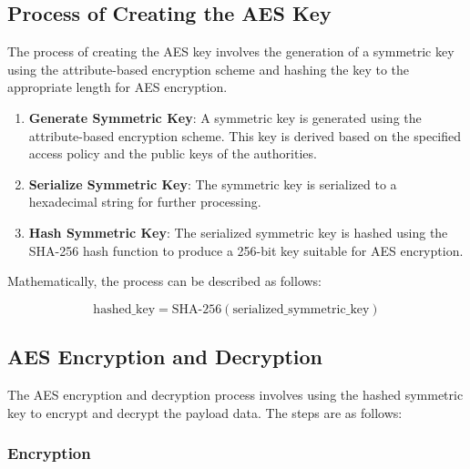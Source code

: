 \documentclass[cic,tc,english]{iiufrgs}
\begin{document}
    \subsection{Process of Creating the AES Key}

    The process of creating the AES key involves the generation of a symmetric key using the attribute-based encryption scheme and hashing the key to the appropriate length for AES encryption.

    \begin{enumerate}
        \item \textbf{Generate Symmetric Key}: A symmetric key is generated using the attribute-based encryption scheme. This key is derived based on the specified access policy and the public keys of the authorities.
        \item \textbf{Serialize Symmetric Key}: The symmetric key is serialized to a hexadecimal string for further processing.
        \item \textbf{Hash Symmetric Key}: The serialized symmetric key is hashed using the SHA-256 hash function to produce a 256-bit key suitable for AES encryption.
    \end{enumerate}

    Mathematically, the process can be described as follows:

    \begin{equation}
    \text{hashed\_key} = \text{SHA-256}(\text{serialized\_symmetric\_key})
    \end{equation}
    \subsection{AES Encryption and Decryption}

    The AES encryption and decryption process involves using the hashed symmetric key to encrypt and decrypt the payload data. The steps are as follows:

    \subsubsection{Encryption}
\end{document}
